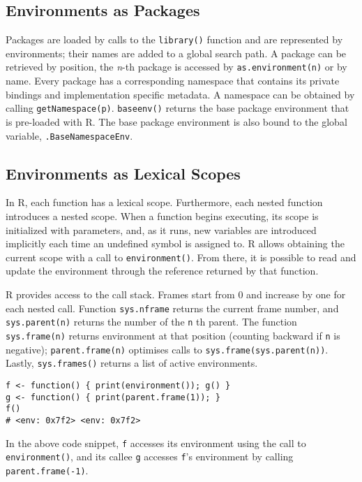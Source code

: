 \documentclass[10pt,sigplan,authorversion=true]{acmart}
\renewcommand{\c}[1]{\lstinline |#1|\xspace}
\begin{document}
\subsection{Environments as Packages}

Packages are loaded by calls to the \c{library()} function and are represented
by environments; their names are added to a global search path. A package can be
retrieved by position, the \emph{n}-th package is accessed by
\c{as.environment(n)} or by name. Every package has a corresponding namespace
that contains its private bindings and implementation specific metadata. A
namespace can be obtained by calling \c{getNamespace(p)}. \c{baseenv()} returns
the base package environment that is pre-loaded with R. The base package
environment is also bound to the global variable, \c{.BaseNamespaceEnv}.


\subsection{Environments as Lexical Scopes}

In R, each function has a lexical scope. Furthermore, each nested function
introduces a nested scope. When a function begins executing, its scope is
initialized with parameters, and, as it runs, new variables are introduced
implicitly each time an undefined symbol is assigned to. R allows obtaining the
current scope with a call to \c{environment()}. From there, it is possible to
read and update the environment through the reference returned by that function.

R provides access to the call stack. Frames start from 0 and increase by one
for each nested call. Function \c{sys.nframe} returns the current frame
number, and \c{sys.parent(n)} returns the number of the \c{n}th parent.
The function \c{sys.frame(n)} returns environment at that position (counting
backward if \c{n} is negative); \c{parent.frame(n)} optimises calls to
\c{sys.frame(sys.parent(n))}. Lastly, \c{sys.frames()} returns a list of
active environments.

\begin{lstlisting}
f <- function() { print(environment()); g() }
g <- function() { print(parent.frame(1)); }
f()
# <env: 0x7f2> <env: 0x7f2>
\end{lstlisting}

\noindent
In the above code snippet, \c{f} accesses its environment using the call to
\c{environment()}, and its callee \c{g} accesses \c{f}'s environment by calling
\c{parent.frame(-1)}.
\end{document}
